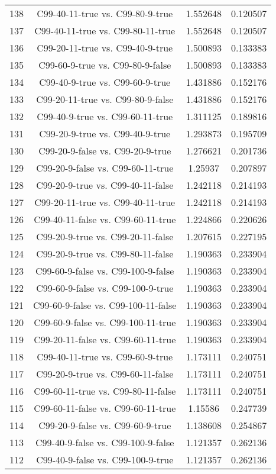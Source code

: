 \documentclass[a4paper,10pt]{article}
\begin{document}
\begin{landscape}
\begin{table}[!htp]
\begin{tabular}{cccc}
138&C99-40-11-true vs. C99-80-9-true&1.552648&0.120507\\
137&C99-40-11-true vs. C99-80-11-true&1.552648&0.120507\\
136&C99-20-11-true vs. C99-40-9-true&1.500893&0.133383\\
135&C99-60-9-true vs. C99-80-9-false&1.500893&0.133383\\
134&C99-40-9-true vs. C99-60-9-true&1.431886&0.152176\\
133&C99-20-11-true vs. C99-80-9-false&1.431886&0.152176\\
132&C99-40-9-true vs. C99-60-11-true&1.311125&0.189816\\
131&C99-20-9-true vs. C99-40-9-true&1.293873&0.195709\\
130&C99-20-9-false vs. C99-20-9-true&1.276621&0.201736\\
129&C99-20-9-false vs. C99-60-11-true&1.25937&0.207897\\
128&C99-20-9-true vs. C99-40-11-false&1.242118&0.214193\\
127&C99-20-11-true vs. C99-40-11-true&1.242118&0.214193\\
126&C99-40-11-false vs. C99-60-11-true&1.224866&0.220626\\
125&C99-20-9-true vs. C99-20-11-false&1.207615&0.227195\\
124&C99-20-9-true vs. C99-80-11-false&1.190363&0.233904\\
123&C99-60-9-false vs. C99-100-9-false&1.190363&0.233904\\
122&C99-60-9-false vs. C99-100-9-true&1.190363&0.233904\\
121&C99-60-9-false vs. C99-100-11-false&1.190363&0.233904\\
120&C99-60-9-false vs. C99-100-11-true&1.190363&0.233904\\
119&C99-20-11-false vs. C99-60-11-true&1.190363&0.233904\\
118&C99-40-11-true vs. C99-60-9-true&1.173111&0.240751\\
117&C99-20-9-true vs. C99-60-11-false&1.173111&0.240751\\
116&C99-60-11-true vs. C99-80-11-false&1.173111&0.240751\\
115&C99-60-11-false vs. C99-60-11-true&1.15586&0.247739\\
114&C99-20-9-false vs. C99-60-9-true&1.138608&0.254867\\
113&C99-40-9-false vs. C99-100-9-false&1.121357&0.262136\\
112&C99-40-9-false vs. C99-100-9-true&1.121357&0.262136\\

\end{tabular}
\end{table}
\end{landscape}
\end{document}
